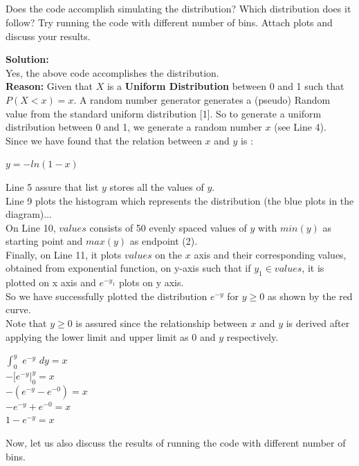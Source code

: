 \documentclass[answers]{exam}
\begin{document}
\subsection{} Does the code accomplish simulating the distribution? Which distribution does it follow? Try running
the code with different number of bins. Attach plots and discuss your results.\\
\begin{framed}
\textbf{Solution:\\}
Yes, the above code accomplishes the distribution.\\
\textbf{Reason:} Given that $X$ is a \textbf{Uniform Distribution} between 0 and 1 such that $P(X < x) = x$. A random number generator generates a (pseudo) Random value from the standard uniform distribution [1]. So to generate a uniform distribution between 0 and 1, we generate a random number $x$ (see Line 4). \\
Since we have found that the relation between $x$ and $y$ is : 
\begin{center}
    $y = -ln(1 - x)$ \\
\end{center}
Line 5 assure that list $y$ stores all the values of $y$. \\
Line 9 plots the histogram which represents the distribution (the blue plots in the diagram)... \\
On Line 10, $values$ consists of 50 evenly spaced values of $y$ with $min(y)$ as starting point and $max(y)$ as endpoint (2). \\
Finally, on Line 11, it plots $values$ on the $x$ axis and their corresponding values, obtained from exponential function, on y-axis such that if $y_1 \in values$, it is plotted on x axis and $e^{-y_1}$ plots on y axis. \\
So we have successfully plotted the distribution $e^{-y}$ for $y \geq 0$ as shown by the red curve. \\
Note that $y \geq 0$ is assured since the relationship between $x$ and $y$ is derived after applying the lower limit and upper limit as $0$ and $y$ respectively. 
\begin{center}
    $\int^y_0 \, \, e^{-y} \, \, dy = x$\\
    $- \Bigr[ e^{-y} \Bigr|^y_0 = x$\\
    $- (e^{-y} - e^{-0}) = x$\\
    $- e^{-y} + e^{-0} = x $\\
    $1 - e^{-y}  = x$\\
\end{center}
Now, let us also discuss the results of running the code with different number of bins. 


\end{framed}
\end{document}
